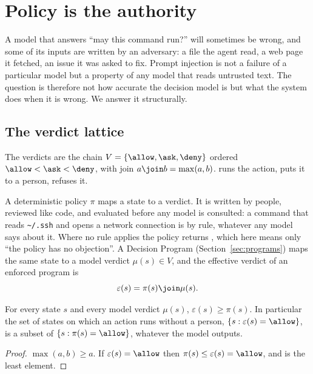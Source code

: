 \section{Policy is the authority}
\label{sec:authority}

A model that answers ``may this command run?'' will sometimes be wrong, and
some of its inputs are written by an adversary: a file the agent read, a web
page it fetched, an issue it was asked to fix. Prompt injection is not a
failure of a particular model but a property of any model that reads untrusted
text. The question is therefore not how accurate the decision model is but what
the system does when it is wrong. We answer it structurally.

\subsection{The verdict lattice}

\begin{definition}[Verdicts]
The verdicts are the chain $V = \{\allow, \ask, \deny\}$ ordered
$\allow < \ask < \deny$, with join $a \join b = \max(a, b)$. \allow{} runs the
action, \ask{} puts it to a person, \deny{} refuses it.
\end{definition}

A deterministic policy $\pi$ maps a state to a verdict. It is written by
people, reviewed like code, and evaluated before any model is consulted: a
command that reads \texttt{\textasciitilde/.ssh} and opens a network connection is \deny{}
by rule, whatever any model says about it. Where no rule applies the policy
returns \allow, which here means only ``the policy has no objection''. A
Decision Program (Section~\ref{sec:programs}) maps the same state to a model
verdict $\mu(s) \in V$, and the effective verdict of an enforced program is
\begin{equation}
  \varepsilon(s) = \pi(s) \join \mu(s).
  \label{eq:join}
\end{equation}

\begin{proposition}
\label{prop:tighten}
For every state $s$ and every model verdict $\mu(s)$,
$\varepsilon(s) \ge \pi(s)$. In particular the set of states on which an
action runs without a person, $\{s : \varepsilon(s) = \allow\}$, is a subset
of $\{s : \pi(s) = \allow\}$, whatever the model outputs.
\end{proposition}
\begin{proof}
$\max(a, b) \ge a$. If $\varepsilon(s) = \allow$ then
$\pi(s) \le \varepsilon(s) = \allow$, and \allow{} is the least element.
\end{proof}

